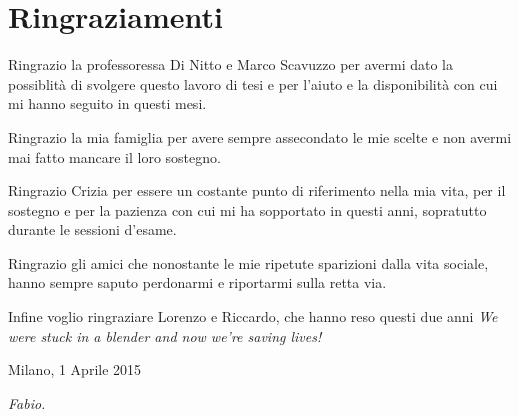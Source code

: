 \chapter*{Ringraziamenti}
Ringrazio la professoressa Di Nitto e Marco Scavuzzo per avermi dato la possiblit\`{a} di svolgere questo lavoro di tesi e per l'aiuto e la disponibilit\`{a} con cui mi hanno seguito in questi mesi.

\noindent Ringrazio la mia famiglia per avere sempre assecondato le mie scelte e non avermi mai fatto mancare il loro sostegno.
 
\noindent Ringrazio Crizia per essere un costante punto di riferimento nella mia vita, per il sostegno e per la pazienza con cui mi ha sopportato in questi anni, sopratutto durante le sessioni d'esame.

\noindent Ringrazio gli amici che nonostante le mie ripetute sparizioni dalla vita sociale, hanno sempre saputo perdonarmi e riportarmi sulla retta via.

\noindent Infine voglio ringraziare Lorenzo e Riccardo, che hanno reso questi due anni
\noindent \textit{We were stuck in a blender and now we're saving lives!}

\begin{flushleft}
Milano, 1 Aprile 2015
\end{flushleft}

\begin{flushright}
\emph{Fabio.}
\end{flushright}

\cleardoublepage